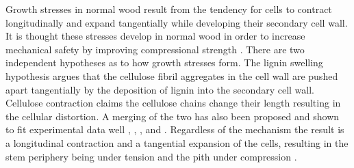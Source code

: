 Growth stresses in normal wood result from the tendency for cells to contract longitudinally and expand tangentially while developing their secondary cell wall. It is thought these stresses develop in normal wood in order to increase mechanical safety by improving compressional strength . There are two independent hypotheses as to how growth stresses form. The lignin swelling hypothesis \citep{ISI:A1950XU10300003} argues that the cellulose fibril aggregates in the cell wall are pushed apart tangentially by the deposition of lignin into the secondary cell wall. Cellulose contraction \citep{Bamber1979}\citep{bamber2001general} claims the cellulose chains change their length resulting in the cellular distortion. A merging of the two has also been proposed and shown to fit experimental data well \cite{okuyama1986}, \cite{Okuyama_1994}, \cite{yamamoto1991}, \cite{ISI:A1992HP18200001} and \cite{Yamamoto_1998}. Regardless of the mechanism the result is a longitudinal contraction and a tangential expansion of the cells, resulting in the stem periphery being under tension and the pith under compression \cite{Archer_1987}. 